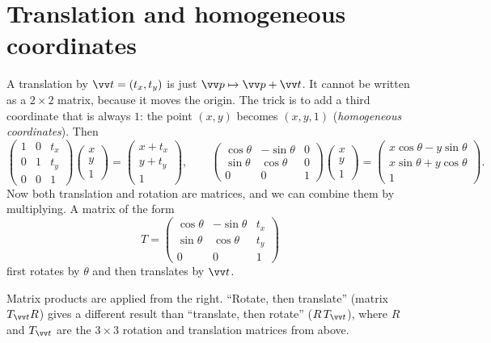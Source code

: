 \section*{Translation and homogeneous coordinates}
A translation by $\vv t=(t_x,t_y)$ is just $\vv p\mapsto\vv p+\vv t$. It cannot be written as a $2\times2$ matrix, because it moves the origin. The trick is to add a third coordinate that is always $1$: the point $(x,y)$ becomes $(x,y,1)$ (\emph{homogeneous coordinates}). Then
\[
\begin{pmatrix}1&0&t_x\\0&1&t_y\\0&0&1\end{pmatrix}\begin{pmatrix}x\\y\\1\end{pmatrix}=\begin{pmatrix}x+t_x\\y+t_y\\1\end{pmatrix},\qquad
\begin{pmatrix}\cos\theta&-\sin\theta&0\\\sin\theta&\cos\theta&0\\0&0&1\end{pmatrix}\begin{pmatrix}x\\y\\1\end{pmatrix}=\begin{pmatrix}x\cos\theta-y\sin\theta\\x\sin\theta+y\cos\theta\\1\end{pmatrix}.
\]
Now both translation and rotation are matrices, and we can combine them by multiplying. A matrix of the form
\[
T=\begin{pmatrix}\cos\theta&-\sin\theta&t_x\\\sin\theta&\cos\theta&t_y\\0&0&1\end{pmatrix}
\]
first rotates by $\theta$ and then translates by $\vv t$.

\begin{keyidea}
Matrix products are applied from the right. ``Rotate, then translate'' (matrix $T_{\vv t}R$) gives a different result than ``translate, then rotate'' ($R\,T_{\vv t}$), where $R$ and $T_{\vv t}$ are the $3\times3$ rotation and translation matrices from above.
\end{keyidea}

